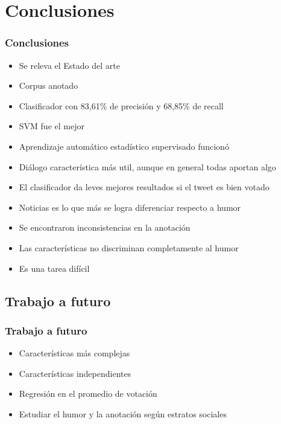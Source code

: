 \section{Conclusiones}

\begin{frame}
    \frametitle{Conclusiones}
    
    \begin{itemize}[<+->]
    	\item[\checkmark] Se releva el Estado del arte
    	\item[\checkmark] Corpus anotado
    	\item[\checkmark] Clasificador con 83,61\% de precisión y 68,85\% de recall
    	\item[\checkmark] SVM fue el mejor
    	\item[\checkmark] Aprendizaje automático estadístico supervisado funcionó
    	\item[\checkmark] Diálogo característica más util, aunque en general todas aportan algo
    	\item[\checkmark] El clasificador da leves mejores resultados si el tweet es bien votado
    	\item[\checkmark] Noticias es lo que más se logra diferenciar respecto a humor
    	\item[\checkmark] Se encontraron inconsistencias en la anotación
    	\item[\checkmark] Las características no discriminan completamente al humor
    	\item[\checkmark] Es una tarea difícil
    \end{itemize}
\end{frame}

\subsection{Trabajo a futuro}
\begin{frame}
    \frametitle{Trabajo a futuro}
    
    \begin{itemize}[<+->]
    	\item Características más complejas
    	\item Características independientes
    	\item Regresión en el promedio de votación
    	\item Estudiar el humor y la anotación según estratos sociales
    \end{itemize}
\end{frame}
